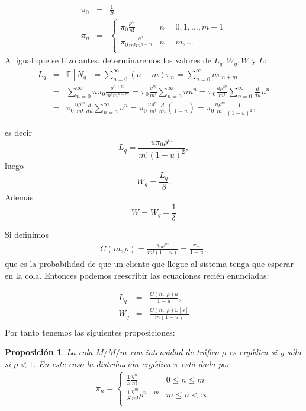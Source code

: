 \documentclass{article}
\newtheorem{Prop}{Proposición}[section]
\newcommand{\esp}{\mathbb{E}}
\numberwithin{equation}{section}
\begin{document}
\begin{eqnarray}
\pi_{0}&=&\frac{1}{S}\\
\pi_{n}&=&\left\{\begin{array}{cc}
\pi_{0}\frac{\rho^{n}}{n!} & n=0,1,\ldots,m-1\\
\pi_{0}\frac{\rho^{n}}{m!m^{n-m}}& n=m,\ldots\\
\end{array}\right.
\end{eqnarray}
Al igual que se hizo antes, determinaremos los valores de
$L_{q},W_{q},W$ y $L$:
\begin{eqnarray*}
L_{q}&=&\esp\left[N_{q}\right]=\sum_{n=0}^{\infty}\left(n-m\right)\pi_{n}=\sum_{n=0}^{\infty}n\pi_{n+m}\\
&=&\sum_{n=0}^{\infty}n\pi_{0}\frac{\rho^{n+m}}{m!m^{n+m}}=\pi_{0}\frac{\rho^{m}}{m!}\sum_{n=0}^{\infty}nu^{n}=\pi_{0}\frac{u\rho^{m}}{m!}\sum_{n=0}^{\infty}\frac{d}{du}u^{n}\\
&=&\pi_{0}\frac{u\rho^{m}}{m!}\frac{d}{du}\sum_{n=0}^{\infty}u^{n}=\pi_{0}\frac{u\rho^{m}}{m!}\frac{d}{du}\left(\frac{1}{1-u}\right)=\pi_{0}\frac{u\rho^{m}}{m!}\frac{1}{\left(1-u\right)^{2}},
\end{eqnarray*}

es decir
\begin{equation}
L_{q}=\frac{u\pi_{0}\rho^{m}}{m!\left(1-u\right)^{2}},
\end{equation}
luego
\begin{equation}
W_{q}=\frac{L_{q}}{\beta}.
\end{equation}
Adem\'as
\begin{equation}
W=W_{q}+\frac{1}{\delta}
\end{equation}

Si definimos
\begin{eqnarray}
C\left(m,\rho\right)=\frac{\pi_{0}\rho^{m}}{m!\left(1-u\right)}=\frac{\pi_{m}}{1-u},
\end{eqnarray}
que es la probabilidad de que un cliente que llegue al sistema
tenga que esperar en la cola. Entonces podemos reescribir las
ecuaciones reci\'en enunciadas:

\begin{eqnarray}
L_{q}&=&\frac{C\left(m,\rho\right)u}{1-u},\\
W_{q}&=&\frac{C\left(m,\rho\right)\esp\left[s\right]}{m\left(1-u\right)}\\
\end{eqnarray}
Por tanto tenemos las siguientes proposiciones:

\begin{Prop}
La cola $M/M/m$ con intensidad de tr\'afico $\rho$ es erg\'odica si y s\'olo si $\rho<1$. En este caso la distribuci\'on erg\'odica $\pi$ est\'a dada por
\begin{eqnarray}
\pi_{n}=\left\{\begin{array}{cc}
\frac{1}{S}\frac{\eta^{n}}{n!} & 0\leq n\leq m\\
\frac{1}{S}\frac{\eta^{m}}{m!}\rho^{n-m} & m\leq n<\infty\\
\end{array}\right.
\end{eqnarray}
\end{Prop}
\end{document}
